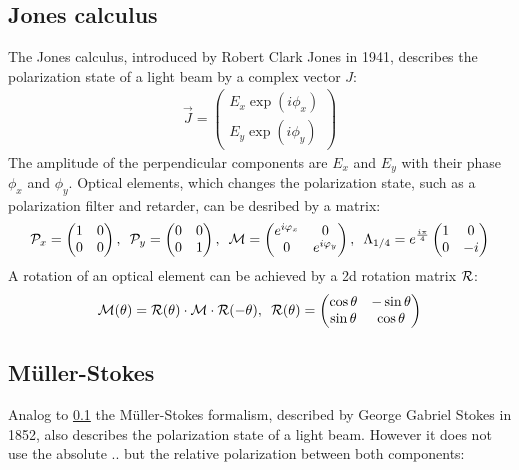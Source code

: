 \subsection{Jones calculus}
\label{sec:jones}
% 
The Jones calculus, introduced by Robert Clark Jones in 1941, describes the polarization state of a light beam by a complex vector $J$:
% 
\begin{align}
    \vec{J} = \begin{pmatrix} E_x \exp(i \phi_x) \\ E_y \exp(i \phi_y) \end{pmatrix}
\end{align}
% 
The amplitude of the perpendicular components are $E_x$ and $E_y$ with their phase $\phi_x$ and $\phi_y$.
Optical elements, which changes the polarization state, such as a polarization filter and retarder, can be desribed by a matrix:
% 
\begin{align}
\begin{split}
\mathcal{P}_x = 
\begin{pmatrix}
1 & 0 \\ 0 & 0
\end{pmatrix}
, \enspace
\mathcal{P}_y = 
\begin{pmatrix}
0 & 0 \\ 0 & 1
\end{pmatrix}
, \enspace
\mathcal{M} =
\begin{pmatrix}
e^{i \varphi_x} & 0 \\ 0 & e^{i \varphi_y}
\end{pmatrix}
, \enspace
\Lambda_{1/4}=
e^{\frac{i \pi}{4}}
\begin{pmatrix}
1 & 0 \\ 0 & -i
\end{pmatrix}
\end{split}
\end{align}
% 
A rotation of an optical element can be achieved by a 2d rotation matrix $\mathcal{R}$:
% 
\begin{align}
\begin{split}
\mathcal{M}(\theta )=\mathcal{R}(\theta )\cdot\mathcal{M}\cdot\mathcal{R}(-\theta )
, \enspace
\mathcal{R}(\theta ) = 
\begin{pmatrix}
\cos \theta & -\sin \theta \\
\sin \theta & \cos \theta
\end{pmatrix}
\end{split}
\end{align}
% 
% 
% 
\subsection{M\"uller-Stokes}\label{sec:Mueller-Stokes}
\label{sec:mueller_stokes}
% 
Analog to \cref{sec:jones} the M\"uller-Stokes formalism, described by George Gabriel Stokes in 1852, also describes the polarization state of a light beam.
However it does not use the absolute .. but the relative polarization between both components:
% 
